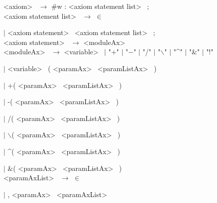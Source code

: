 \noindent
\textless axiom\textgreater~ $\rightarrow$  \#w : \textless axiom statement list\textgreater~ ; \\



\noindent
\textless axiom statement list\textgreater~ $\rightarrow$ $\in$ 

\hspace{2cm} $|$ \textless axiom statement\textgreater~ \textless axiom statement list\textgreater~ ; \\



\noindent
\textless axiom statement\textgreater~ $\rightarrow$ \textless moduleAx\textgreater~ \\



\noindent
\textless moduleAx\textgreater~  $\rightarrow$ \textless variable\textgreater~ $|$ "$+$" $|$ "$-$" $|$ "/" $|$ "$\backslash$" $|$ "\textasciicircum" $|$ "$\&$" $|$ "!" 

\hspace{2cm} $|$ \textless variable\textgreater~ (  \textless paramAx\textgreater~ \textless paramListAx\textgreater~ )

\hspace{2cm} $|$ +(  \textless paramAx\textgreater~ \textless paramListAx\textgreater~ ) 

\hspace{2cm} $|$ -(  \textless paramAx\textgreater~ \textless paramListAx\textgreater~ ) 

\hspace{2cm} $|$ /(  \textless paramAx\textgreater~ \textless paramListAx\textgreater~ ) 

\hspace{2cm} $|$ $\backslash$(  \textless paramAx\textgreater~ \textless paramListAx\textgreater~ )

\hspace{2cm} $|$ \textasciicircum (  \textless paramAx\textgreater~ \textless paramListAx\textgreater~ ) 

\hspace{2cm} $|$ $\&$(  \textless paramAx\textgreater~ \textless paramListAx\textgreater~ ) \\



\noindent
\textless paramAxList\textgreater~ $\rightarrow$  $\in$ 

\hspace{2cm} $|$ , \textless paramAx\textgreater~ \textless paramAxList\textgreater~ \\




